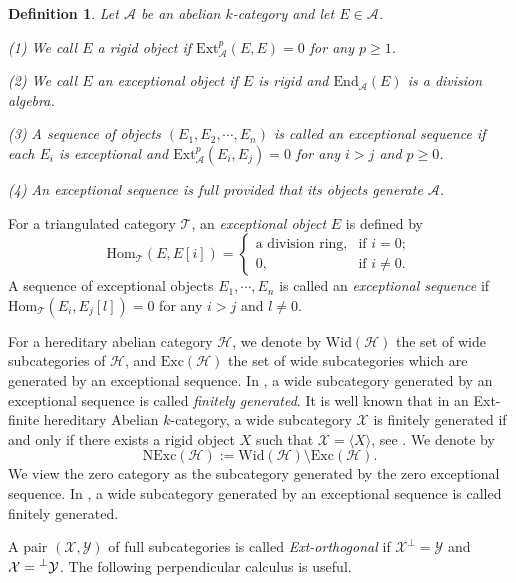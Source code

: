 \documentclass[a4paper, 11pt, reqno]{amsart}
\numberwithin{equation}{section}
\newtheorem{defn}[thm]{Definition}
\theoremstyle{remark}
\theoremstyle{definition}
\begin{document}
\begin{defn} \label{exceptional}
Let $\mathcal A$ be an abelian $k$-category and let $E \in \mathcal A$. 

(1) We call $E$ a \emph{rigid} object if $\mathrm{Ext}_{\mathcal A}^p(E,E)=0$ for any $p \geq 1$. 

(2) We call $E$ an \emph{exceptional} object if $E$ is rigid and $\mathrm{End}_{\mathcal A}(E)$ is a division algebra. 

(3) A sequence of objects $(E_1,E_2, \cdots ,E_n)$ is called an \emph{exceptional sequence} if each $E_i$ is exceptional and $\mathrm{Ext}_{\mathcal A}^p(E_i,E_j)=0$ for any $i>j$ and $p \geq 0$.

(4) An exceptional sequence is \emph{full} provided that its objects generate $\mathcal A$.
\end{defn}

For a triangulated category $\mathcal T$, an \emph{exceptional object} $E$ is defined by 
\[
\mathrm{Hom}_{\mathcal T}(E,E[i])=\begin{cases}
   \text{a division ring}, &\text{if } i=0; \\
   0, &\text{if } i \neq 0.
\end{cases}
\]
A sequence of exceptional objects $E_1,\cdots,E_n$ is called an \emph{exceptional sequence} if $\mathrm{Hom}_{\mathcal T}(E_i,E_j[l])=0$ for any $i>j$ and $l \neq 0$.

For a hereditary abelian category $\mathcal H$, we denote by $\mathrm{Wid}(\mathcal H)$ the set of wide subcategories of $\mathcal H$, and $\mathrm{Exc}(\mathcal H)$ the set of wide subcategories which are generated by an exceptional sequence. In \cite{ingalls2009noncrossing}, a wide subcategory generated by an exceptional sequence is called \emph{finitely generated}. It is well known that in an Ext-finite hereditary Abelian $k$-category, a wide subcategory $\mathcal X$ is finitely generated if and only if there exists a rigid object $X$ such that $\mathcal X=\langle X \rangle$, see \cite[Proposition~2.7]{cheng2024wide}. We denote by 
\[\mathrm{NExc}(\mathcal H):=\mathrm{Wid}(\mathcal H) \setminus \mathrm{Exc}(\mathcal H).\] 
We view the zero category as the subcategory generated by the zero exceptional sequence. In \cite{ingalls2009noncrossing}, a wide subcategory generated by an exceptional sequence is called finitely generated.

A pair $(\mathcal X,\mathcal Y)$ of full subcategories is called \emph{Ext-orthogonal} if $\mathcal X^{\perp}=\mathcal Y$ and $\mathcal X=\prescript{\perp}{}{\mathcal Y}$. The following perpendicular calculus is useful. 
\end{document}

